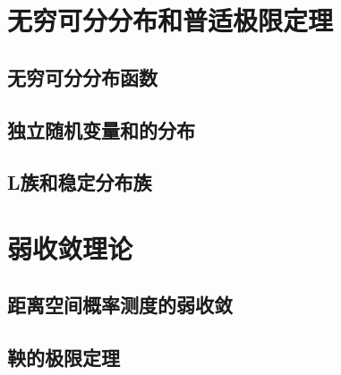 \chapter{无穷可分分布和普适极限定理}
	\section{无穷可分分布函数}
	\section{独立随机变量和的分布}
	\section{L族和稳定分布族}
	
\chapter{弱收敛理论}
	\section{距离空间概率测度的弱收敛}
	\section{鞅的极限定理}
	